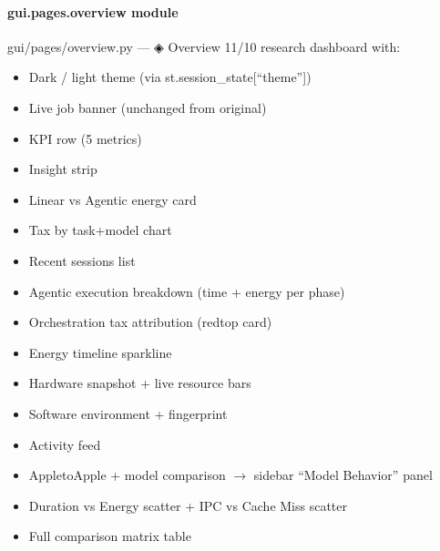 \documentclass[letterpaper,10pt,english]{sphinxmanual}
\begin{document}
\paragraph{gui.pages.overview module}
\label{\detokenize{gui.pages.overview:module-gui.pages.overview}}\label{\detokenize{gui.pages.overview:gui-pages-overview-module}}\label{\detokenize{gui.pages.overview::doc}}
\sphinxAtStartPar
gui/pages/overview.py  —  ◈  Overview
11/10 research dashboard with:
\begin{itemize}
\item {} 
\sphinxAtStartPar
Dark / light theme (via st.session\_state{[}“theme”{]})

\item {} 
\sphinxAtStartPar
Live job banner (unchanged from original)

\item {} 
\sphinxAtStartPar
KPI row (5 metrics)

\item {} 
\sphinxAtStartPar
Insight strip

\item {} 
\sphinxAtStartPar
Linear vs Agentic energy card

\item {} 
\sphinxAtStartPar
Tax by task+model chart

\item {} 
\sphinxAtStartPar
Recent sessions list

\item {} 
\sphinxAtStartPar
Agentic execution breakdown (time + energy per phase)

\item {} 
\sphinxAtStartPar
Orchestration tax attribution (red\sphinxhyphen{}top card)

\item {} 
\sphinxAtStartPar
Energy timeline sparkline

\item {} 
\sphinxAtStartPar
Hardware snapshot + live resource bars

\item {} 
\sphinxAtStartPar
Software environment + fingerprint

\item {} 
\sphinxAtStartPar
Activity feed

\item {} 
\sphinxAtStartPar
Apple\sphinxhyphen{}to\sphinxhyphen{}Apple + model comparison \(\rightarrow\) sidebar “Model Behavior” panel

\item {} 
\sphinxAtStartPar
Duration vs Energy scatter + IPC vs Cache Miss scatter

\item {} 
\sphinxAtStartPar
Full comparison matrix table

\end{itemize}
\end{document}
